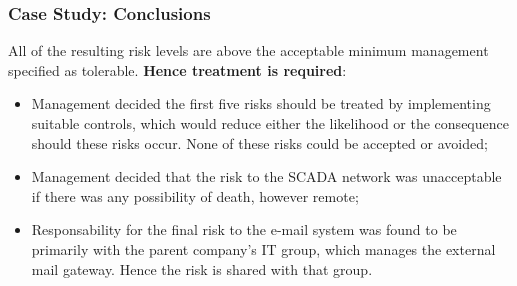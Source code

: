\documentclass[xcolor ={table,usenames,dvipsnames}]{beamer}
\theoremstyle{definition}
\begin{document}
	\begin{frame}
		\frametitle{Case Study: Conclusions}
		All of the resulting risk levels are above the acceptable minimum management specified as tolerable. \textbf{Hence treatment is required}:
		\begin{itemize}
			\item Management decided the first five risks should be treated
			by implementing suitable controls, which would reduce either the likelihood or the consequence should these risks occur. None of these risks could be accepted or avoided;
			\item Management decided that the risk to the SCADA network was
			unacceptable if there was any possibility of death, however remote;
			\item Responsability for the final risk	to the e-mail system was found to be primarily with the parent company’s IT group, which manages the external mail gateway. Hence the risk is shared with that group.
		\end{itemize}
	\end{frame}



	

	







	

	
\end{document}
